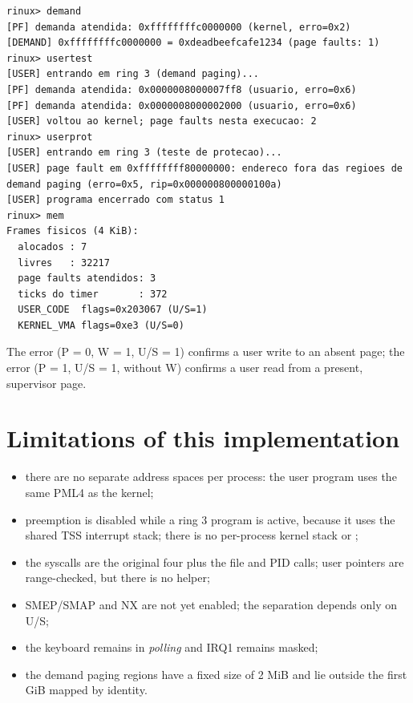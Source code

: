 \begin{lstlisting}[style=shell,caption={Output of the memory and ring 3 commands.},label={lst:testdemand}]
rinux> demand
[PF] demanda atendida: 0xffffffffc0000000 (kernel, erro=0x2)
[DEMAND] 0xffffffffc0000000 = 0xdeadbeefcafe1234 (page faults: 1)
rinux> usertest
[USER] entrando em ring 3 (demand paging)...
[PF] demanda atendida: 0x0000008000007ff8 (usuario, erro=0x6)
[PF] demanda atendida: 0x0000008000002000 (usuario, erro=0x6)
[USER] voltou ao kernel; page faults nesta execucao: 2
rinux> userprot
[USER] entrando em ring 3 (teste de protecao)...
[USER] page fault em 0xffffffff80000000: endereco fora das regioes de demand paging (erro=0x5, rip=0x000000800000100a)
[USER] programa encerrado com status 1
rinux> mem
Frames fisicos (4 KiB):
  alocados : 7
  livres   : 32217
  page faults atendidos: 3
  ticks do timer       : 372
  USER_CODE  flags=0x203067 (U/S=1)
  KERNEL_VMA flags=0xe3 (U/S=0)
\end{lstlisting}

The  error (P = 0, W = 1, U/S = 1) confirms a user write to an
absent page; the  error (P = 1, U/S = 1, without W) confirms a
user read from a present, supervisor page.

\section{Limitations of this implementation}

\begin{itemize}
  \item there are no separate address spaces per process: the
        user program uses the same PML4 as the kernel;
  \item preemption is disabled while a ring 3 program is active, because it
        uses the shared TSS interrupt stack; there is no per-process kernel
        stack or ;
  \item the syscalls are the original four plus the file and PID calls;
        user pointers are range-checked, but there is no
         helper;
  \item SMEP/SMAP and NX are not yet enabled; the separation
        depends only on U/S;
  \item the keyboard remains in \emph{polling} and IRQ1 remains masked;
  \item the demand paging regions have a fixed size of 2 MiB and lie
        outside the first GiB mapped by identity.
\end{itemize}
